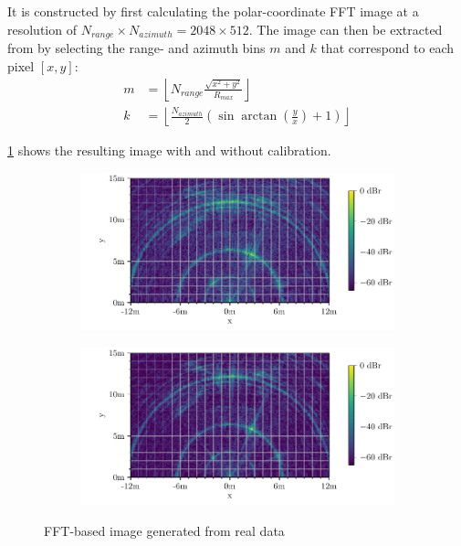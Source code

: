 It is constructed by first calculating the polar-coordinate FFT image at a resolution of $N_{range}\times N_{azimuth} = 2048 \times 512$.
The image can then be extracted from by selecting the range- and azimuth bins $m$ and $k$ that correspond to each pixel $[x,y]$:
\begin{align}
    m & = \left\lfloor N_{range} \frac{\sqrt{x^2 + y^2} }{R_{max}} \right\rfloor                              \\
    k & = \left\lfloor \frac{N_{azimuth}}{2} \left(\sin\arctan\left(\frac{y}{x}\right)+1\right) \right\rfloor
\end{align}

\cref{fig:fft_testimg} shows the resulting image with and without calibration.
\begin{figure}
    \centering
    \begin{subfigure}{0.8\textwidth}
        \includegraphics[width=\textwidth]{../figures/testimg_uncalibrated_fft.pdf}
    \end{subfigure}
    \begin{subfigure}{0.8\textwidth}
        \includegraphics[width=\textwidth]{../figures/testimg_calibrated_fft.pdf}
    \end{subfigure}
    \caption{FFT-based image generated from real data}
    \label{fig:fft_testimg}
\end{figure}
